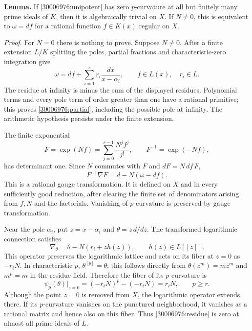 \documentclass[11pt,a4paper]{article}
\numberwithin{equation}{section}
\begin{document}
\textbf{Lemma.}
If \eqref{30006976:unipotent} has zero $p$-curvature at all but finitely many prime
ideals of $K$, then it is algebraically trivial on $X$. If $N\ne0$, this is
equivalent to $\omega=df$ for a rational function $f\in K(x)$ regular on $X$.

\emph{Proof.}
For $N=0$ there is nothing to prove. Suppose $N\ne0$. After a finite extension
$L/K$ splitting the poles, partial fractions and characteristic-zero
integration give
\begin{equation}\label{30006976:partial}
 \omega=df+\sum_{i=1}^s r_i\frac{dx}{x-\alpha_i},
 \qquad f\in L(x),\quad r_i\in L.
\end{equation}
The residue at infinity is minus the sum of the displayed residues. Polynomial
terms and every pole term of order greater than one have a rational primitive;
this proves \eqref{30006976:partial}, including the possible pole at infinity.
The arithmetic hypothesis persists under the finite extension.

The finite exponential
\begin{equation}\label{30006976:gauge}
 F=\exp(Nf)=\sum_{j=0}^{r-1}\frac{N^jf^j}{j!},
 \qquad F^{-1}=\exp(-Nf),
\end{equation}
has determinant one. Since $N$ commutes with $F$ and $dF=N\,df\,F$,
\[
 F^{-1}\nabla F=d-N(\omega-df).
\]
This is a rational gauge transformation. It is defined on $X$ and in every
sufficiently good reduction, after clearing the finite set of denominators
arising from $f,N$ and the factorials. Vanishing of $p$-curvature is
preserved by gauge transformation.

Near the pole $\alpha_i$, put $z=x-\alpha_i$ and
$\theta=z\,d/dz$. The transformed logarithmic connection satisfies
\[
 \nabla_\theta=\theta-N(r_i+zh(z)),\qquad h(z)\in L[\![z]\!].
\]
This operator preserves the logarithmic lattice and acts on its fiber
at $z=0$ as $-r_iN$. In characteristic $p$, $\theta^{[p]}=\theta$;
this follows directly from $\theta(z^m)=mz^m$ and $m^p=m$ in the residue
field. Therefore the fiber of its $p$-curvature is
\begin{equation}\label{30006976:residue}
 \psi_p(\theta)\big|_{z=0}=(-r_iN)^p-(-r_iN)=r_iN,
 \qquad p\ge r.
\end{equation}
Although the point $z=0$ is removed from $X$, the logarithmic operator extends
there. If its $p$-curvature vanishes on the punctured neighborhood, it vanishes
as a rational matrix and hence also on this fiber. Thus \eqref{30006976:residue}
is zero at almost all prime ideals of $L$.
\end{document}
